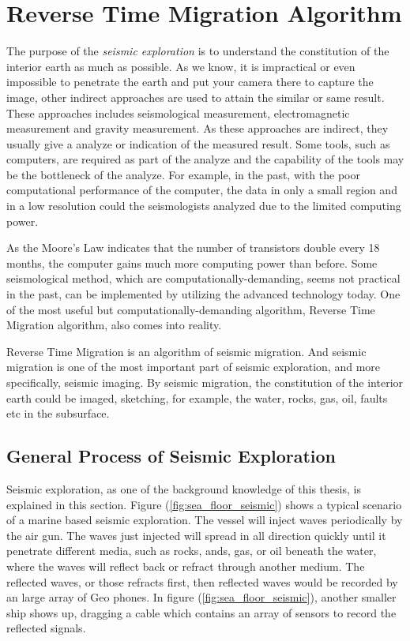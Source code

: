 \chapter{Reverse Time Migration Algorithm}

The purpose of the \emph{seismic exploration} is to understand the
constitution of the interior earth as much as possible. As we know, it is
impractical or even impossible to penetrate the earth and put your camera
there to capture the image, other indirect approaches are used to attain
the similar or same result. These approaches includes seismological
measurement, electromagnetic measurement and gravity measurement. As these
approaches are indirect, they usually give a analyze or indication of the
measured result. Some tools, such as computers, are required as part of the
analyze and the capability of the tools may be the bottleneck of the
analyze. For example, in the past, with the poor computational performance
of the computer, the data in only a small region and in a low resolution
could the seismologists analyzed due to the limited computing power.

As the Moore's Law indicates that the number of transistors double every 18
months, the computer gains much more computing power than before. Some
seismological method, which are computationally-demanding, seems not
practical in the past, can be implemented by utilizing the advanced
technology today. One of the most useful but computationally-demanding
algorithm, Reverse Time Migration algorithm, also comes into reality.

Reverse Time Migration is an algorithm of seismic migration. And seismic
migration is one of the most important part of seismic exploration, and
more specifically, seismic imaging. By seismic migration, the constitution
of the interior earth could be imaged, sketching, for example, the water,
rocks, gas, oil, faults etc in the subsurface.

\section{General Process of Seismic Exploration}

Seismic exploration, as one of the background knowledge of this thesis,
is explained in this section. Figure (\ref{fig:sea_floor_seismic}) shows a
typical scenario of a marine
based seismic exploration. The vessel will inject waves periodically by the
air gun. The waves just injected will spread in all direction quickly until
it penetrate different media, such as rocks, ands, gas, or oil beneath the
water, where the waves will reflect back or refract through another medium.
The reflected waves, or those refracts first, then reflected waves would be
recorded by an large array of Geo phones. In figure
(\ref{fig:sea_floor_seismic}), another smaller ship shows up, dragging a
cable
which contains an array of sensors to record the reflected signals.

